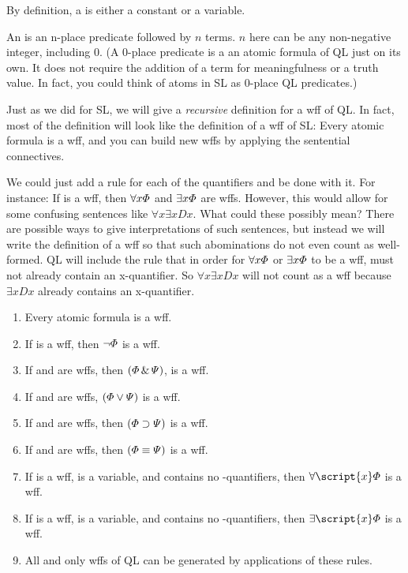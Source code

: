 By definition, a  is either a constant or a variable.

An  is an n-place predicate followed by $n$ terms. $n$ here can be any non-negative integer, including 0. (A 0-place predicate is a an atomic formula of QL just on its own. It does not require the addition of a term for meaningfulness or a truth value. In fact, you could think of atoms in SL as 0-place QL predicates.)

Just as we did for SL, we will give a \emph{recursive} definition for a wff of QL. In fact, most of the definition will look like the definition of a wff of SL: Every atomic formula is a wff, and you can build new wffs by applying the sentential connectives.

We could just add a rule for each of the quantifiers and be done with it. For instance: If \metaA{} is a wff, then $\forall x\varPhi{}$ and $\exists x\varPhi{}$ are wffs. However, this would allow for some confusing sentences like $\forall x\exists x Dx$. What could these possibly mean? There are possible ways to give interpretations of such sentences, but instead we will write the definition of a wff so that such abominations do not even count as well-formed. QL will include the rule that in order for $\forall x\varPhi{}$ or $\exists x\varPhi{}$ to be a wff, \metaA{} must not already contain an x-quantifier. So $\forall x \exists x Dx$ will not count as a wff because $\exists x Dx$ already contains an x-quantifier.

\begin{enumerate}
\item Every atomic formula is a wff.
\item If \metaA{} is a wff, then $\neg\varPhi{}$ is a wff.
\item If \metaA{} and \metaB{} are wffs, then $(\varPhi{}\,\&\,\varPsi{})$, is a wff.
\item If \metaA{} and \metaB{} are wffs, $(\varPhi{}\vee\varPsi{})$ is a wff.
\item If \metaA{} and \metaB{} are wffs, then $(\varPhi{}\supset\varPsi{})$ is a wff.
\item If \metaA{} and \metaB{} are wffs, then $(\varPhi{}\equiv\varPsi{})$ is a wff.
\item If \metaA{} is a wff,  is a variable, and \metaA{} contains no -quantifiers, then $\forall\script{x}\metaA{}$ is a wff.
\item If \metaA{} is a wff,  is a variable, and \metaA{} contains no -quantifiers, then $\exists\script{x}\metaA{}$ is a wff.
\item All and only wffs of QL can be generated by applications of these rules.
\end {enumerate}

